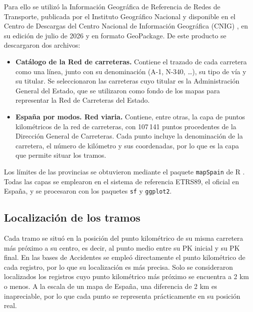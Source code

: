 \documentclass[twoside,a4paper,12pt,onecolumn,openany]{book}
\begin{document}
\vspace{0.5cm}
 
Para ello se utilizó la Información Geográfica de Referencia de Redes de Transporte, publicada por el Instituto Geográfico Nacional y disponible en el Centro de Descargas del Centro Nacional de Información Geográfica (CNIG) \cite{cnig_redes}, en su edición de julio de 2026 y en formato GeoPackage. De este producto se descargaron dos archivos:
 
\begin{itemize}
    \item \textbf{Catálogo de la Red de carreteras.} Contiene el trazado de cada carretera como una línea, junto con su denominación (A-1, N-340, \dots), su tipo de vía y su titular. Se seleccionaron las carreteras cuyo titular es la Administración General del Estado, que se utilizaron como fondo de los mapas para representar la Red de Carreteras del Estado.
    \item \textbf{España por modos. Red viaria.} Contiene, entre otras, la capa de puntos kilométricos de la red de carreteras, con 107\,141 puntos procedentes de la Dirección General de Carreteras. Cada punto incluye la denominación de la carretera, el número de kilómetro y sus coordenadas, por lo que es la capa que permite situar los tramos.
\end{itemize}
 
Los límites de las provincias se obtuvieron mediante el paquete \texttt{mapSpain} de R \cite{mapspain}. Todas las capas se emplearon en el sistema de referencia ETRS89, el oficial en España, y se procesaron con los paquetes \texttt{sf} \cite{pebesma_sf} y \texttt{ggplot2}.
 
\subsection{Localización de los tramos}
 
Cada tramo se situó en la posición del punto kilométrico de su misma carretera más próximo a su centro, es decir, al punto medio entre su PK inicial y su PK final. En las bases de Accidentes se empleó directamente el punto kilométrico de cada registro, por lo que su localización es más precisa. Solo se consideraron localizados los registros cuyo punto kilométrico más próximo se encuentra a 2 km o menos. A la escala de un mapa de España, una diferencia de 2 km es inapreciable, por lo que cada punto se representa prácticamente en su posición real.
 
\vspace{0.5cm}
 
\end{document}
